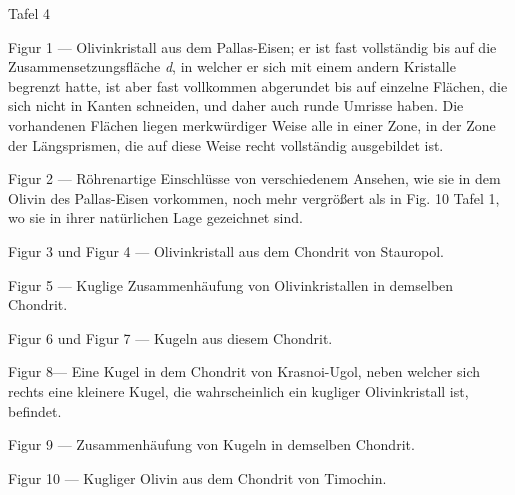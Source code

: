 \documentclass[a4paper, 11pt, oneside]{article}
\begin{document}
Tafel 4

Figur 1 — Olivinkristall aus dem Pallas-Eisen; er ist fast vollständig bis auf die Zusammensetzungsfläche \emph{d}, in welcher er sich mit einem andern Kristalle begrenzt hatte, ist aber fast vollkommen abgerundet bis auf einzelne Flächen, die sich nicht in Kanten schneiden, und daher auch runde Umrisse haben. Die vorhandenen Flächen liegen merkwürdiger Weise alle in einer Zone, in der Zone der Längsprismen, die auf diese Weise recht vollständig ausgebildet ist.

Figur 2 — Röhrenartige Einschlüsse von verschiedenem Ansehen, wie sie in dem Olivin des Pallas-Eisen vorkommen, noch mehr vergrößert als in Fig. 10 Tafel 1, wo sie in ihrer natürlichen Lage gezeichnet sind.

Figur 3 und Figur 4 — Olivinkristall aus dem Chondrit von Stauropol.

Figur 5 — Kuglige Zusammenhäufung von Olivinkristallen in demselben Chondrit.

Figur 6 und Figur 7 — Kugeln aus diesem Chondrit.

Figur 8— Eine Kugel in dem Chondrit von Krasnoi-Ugol, neben welcher sich rechts eine kleinere Kugel, die wahrscheinlich ein kugliger Olivinkristall ist, befindet.

Figur 9 — Zusammenhäufung von Kugeln in demselben Chondrit.

Figur 10 — Kugliger Olivin aus dem Chondrit von Timochin.
\clearpage
\end{document}
